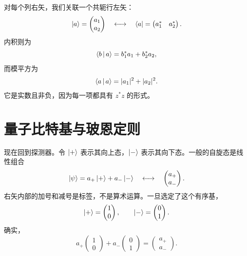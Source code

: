 对每个列右矢，我们关联一个共轭行左矢：
\begin{equation}
  \left\lvert a\right\rangle=
  \begin{pmatrix}a_1\\a_2\end{pmatrix}
  \quad\longleftrightarrow\quad
  \left\langle a\right\rvert=
  \begin{pmatrix}a_1^*&a_2^*\end{pmatrix}.
  \label{eq:l02-bra-ket-components}
\end{equation}
内积则为
\begin{equation}
  \left\langle b\,\middle|\,a\right\rangle=b_1^*a_1+b_2^*a_2,
  \label{eq:l02-inner-product}
\end{equation}
而模平方为
\begin{equation}
  \left\langle a\,\middle|\,a\right\rangle=|a_1|^2+|a_2|^2.
  \label{eq:l02-norm}
\end{equation}
它是实数且非负，因为每一项都具有 \(z^*z\) 的形式。

\begin{classroomqa}
\end{classroomqa}

\section{量子比特基与玻恩定则}

现在回到探测器。令 \(\left\lvert+\right\rangle\) 表示其向上态，\(\left\lvert-\right\rangle\) 表示其向下态。一般的自旋态是线性组合
\begin{equation}
  \left\lvert\psi\right\rangle=a_+\left\lvert+\right\rangle+a_-\left\lvert-\right\rangle
  \quad\longleftrightarrow\quad
  \begin{pmatrix}a_+\\a_-\end{pmatrix}.
  \label{eq:l02-general-qubit}
\end{equation}
右矢内部的加号和减号是标签，不是算术运算。一旦选定了这个有序基，
\begin{equation}
  \left\lvert+\right\rangle=
  \begin{pmatrix}1\\0\end{pmatrix},
  \qquad
  \left\lvert-\right\rangle=
  \begin{pmatrix}0\\1\end{pmatrix}.
  \label{eq:l02-basis-columns}
\end{equation}
确实，
\begin{equation}
  a_+\begin{pmatrix}1\\0\end{pmatrix}
  +a_-\begin{pmatrix}0\\1\end{pmatrix}
  =
  \begin{pmatrix}a_+\\a_-\end{pmatrix}.
  \label{eq:l02-basis-expansion}
\end{equation}

